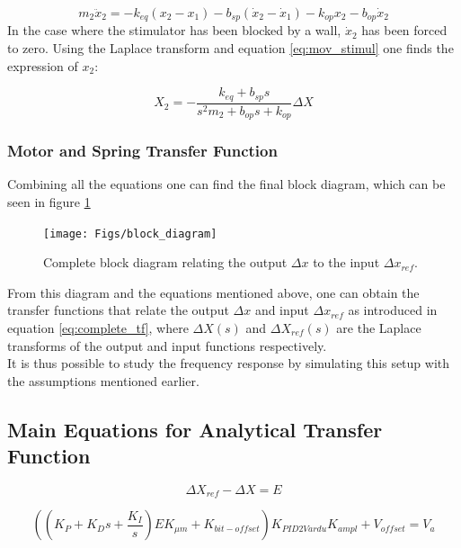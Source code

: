 	\begin{equation}
		m_2 \ddot{x}_2 = -k_{eq} (x_2 - x_1) - b_{sp} (\dot{x}_2 - \dot{x}_1) - k_{op} x_2 - b_{op} \dot{x}_2
		\label{eq:mov_stimul}
	\end{equation}
	In the case where the stimulator has been blocked by a wall, $\dot{x}_2$ has been forced to zero. Using the Laplace transform and equation \ref{eq:mov_stimul} one finds the expression of $x_2$:
	
	\begin{equation}
		X_2 = -\frac{k_{eq} + b_{sp} s}{s^2 m_2 + b_{op} s + k_{op}} \Delta X
		\label{eq:x2dx}
	\end{equation}
	
	\subsubsection{Motor and Spring Transfer Function}
	Combining all the equations one can find the final block diagram, which can be seen in figure \ref{fig:block_diagram}
	\begin{figure}[h!]
		\centering
		\texttt{[image: Figs/block\_diagram]}
		\caption{Complete block diagram relating the output $\Delta x$ to the input $\Delta x_{ref}$.}
		\label{fig:block_diagram}
	\end{figure}


	From this diagram and the equations mentioned above, one can obtain the transfer functions that relate the output $\Delta x$ and input $\Delta x_{ref}$ as introduced in equation \ref{eq:complete_tf},
	where $\Delta X(s)$ and $\Delta X_{ref}(s)$ are the Laplace transforms of the output and input functions respectively. \\
	It is thus possible to study the frequency response by simulating this setup with the assumptions mentioned earlier.
	
	\subsection{Main Equations for Analytical Transfer Function}
	\begin{equation}
		\Delta X_{ref} - \Delta X = E
		\label{eq:error}
	\end{equation}
	
	\begin{equation}
		((K_P + K_D s + \frac{K_I}{s})E K_{\mu m} + K_{bit-offset}) K_{PID2Vardu} K_{ampl} + V_{offset}= V_a
		\label{eq:PID}
	\end{equation}
	
